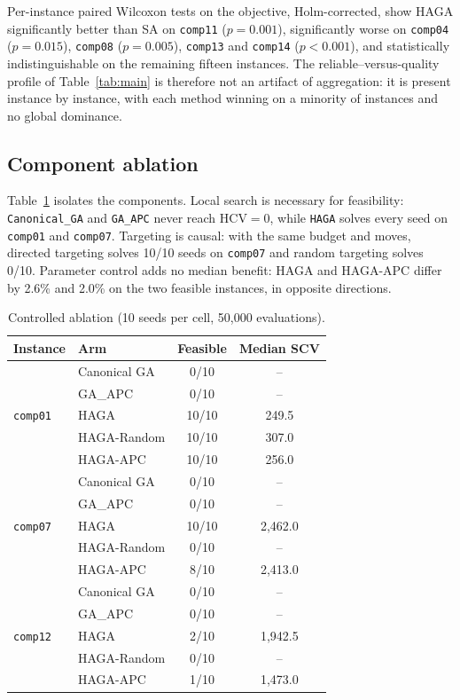 \documentclass[journal]{IEEEtran}
\newcommand{\code}[1]{\texttt{#1}}
\begin{document}
Per-instance paired Wilcoxon tests on the objective, Holm-corrected, show HAGA significantly better than SA on \code{comp11} ($p=0.001$), significantly worse on \code{comp04} ($p=0.015$), \code{comp08} ($p=0.005$), \code{comp13} and \code{comp14} ($p<0.001$), and statistically indistinguishable on the remaining fifteen instances. The reliable--versus-quality profile of Table~\ref{tab:main} is therefore not an artifact of aggregation: it is present instance by instance, with each method winning on a minority of instances and no global dominance.

\subsection{Component ablation}
Table~\ref{tab:ablation} isolates the components. Local search is necessary for feasibility: \code{Canonical\_GA} and \code{GA\_APC} never reach $\mathrm{HCV}=0$, while \code{HAGA} solves every seed on \code{comp01} and \code{comp07}. Targeting is causal: with the same budget and moves, directed targeting solves 10/10 seeds on \code{comp07} and random targeting solves 0/10. Parameter control adds no median benefit: HAGA and HAGA-APC differ by 2.6\% and 2.0\% on the two feasible instances, in opposite directions.

\begin{table}[!t]
\caption{Controlled ablation (10 seeds per cell, 50{,}000 evaluations).}
\label{tab:ablation}
\centering
\small
\begin{tabular}{ll c c}
\toprule
Instance & Arm & Feasible & Median SCV \\
\midrule
\multirow{5}{*}{\code{comp01}}
& Canonical GA      & 0/10 & -- \\
& GA\_APC           & 0/10 & -- \\
& HAGA              & 10/10 & 249.5 \\
& HAGA-Random       & 10/10 & 307.0 \\
& HAGA-APC          & 10/10 & 256.0 \\
\midrule
\multirow{5}{*}{\code{comp07}}
& Canonical GA      & 0/10 & -- \\
& GA\_APC           & 0/10 & -- \\
& HAGA              & 10/10 & 2{,}462.0 \\
& HAGA-Random       & 0/10 & -- \\
& HAGA-APC          & 8/10 & 2{,}413.0 \\
\midrule
\multirow{5}{*}{\code{comp12}}
& Canonical GA      & 0/10 & -- \\
& GA\_APC           & 0/10 & -- \\
& HAGA              & 2/10 & 1{,}942.5 \\
& HAGA-Random       & 0/10 & -- \\
& HAGA-APC          & 1/10 & 1{,}473.0 \\
\bottomrule
\end{tabular}
\end{table}
\end{document}
